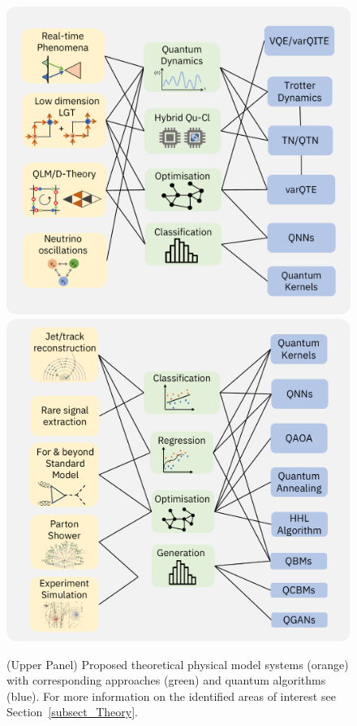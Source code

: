 \begin{figure}[htp!]
    \centering
    \includegraphics[width=.95 \columnwidth, keepaspectratio]{figures/Figure1a.pdf} \\
    \includegraphics[width=.95 \columnwidth, keepaspectratio]{figures/Figure1b.pdf}
    \caption{(Upper Panel) Proposed theoretical physical model systems (orange) with corresponding approaches (green) and quantum algorithms (blue). For more information on the identified areas of interest see Section~\ref{subsect_Theory}. 
}
\end{figure}
